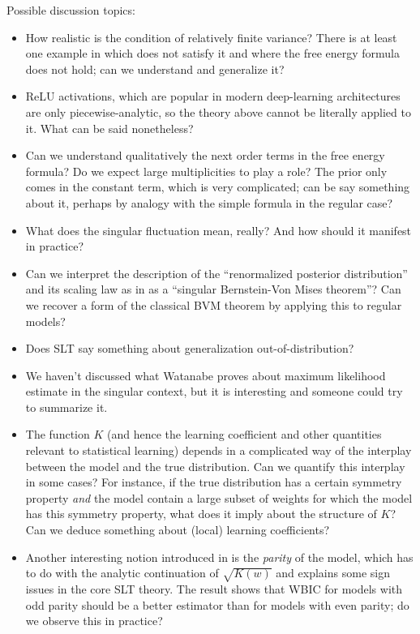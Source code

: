 \documentclass[a4paper,11pt]{amsart}
\begin{document}
Possible discussion topics:
\begin{itemize}
\item How realistic is the condition of relatively finite variance? There is at least one example in \cite[\S 3.4 Example 19]{green-book} which does not satisfy it and where the free energy formula does not hold; can we understand and generalize it?
\item ReLU activations, which are popular in modern deep-learning architectures are only piecewise-analytic, so the theory above cannot be literally applied to it. What can be said nonetheless?
\item Can we understand qualitatively the next order terms in the free energy formula? Do we expect large multiplicities to play a role? The prior only comes in the constant term, which is very complicated; can be say something about it, perhaps by analogy with the simple formula in the regular case?
\item What does the singular fluctuation mean, really? And how should it manifest in practice?
\item Can we interpret the description of the ``renormalized posterior distribution'' and its scaling law as in \cite[\S 6.3]{grey-book} as a ``singular Bernstein-Von Mises theorem''? Can we recover a form of the classical BVM theorem by applying this to regular models?
\item Does SLT say something about generalization out-of-distribution?  
\item We haven't discussed what Watanabe proves about maximum likelihood estimate in the singular context, but it is interesting and someone could try to summarize it.
  \item The function $K$ (and hence the learning coefficient and other quantities relevant to statistical learning) depends in a complicated way of the interplay between the model and the true distribution. Can we quantify this interplay in some cases? For instance, if the true distribution has a certain symmetry property \emph{and} the model contain a large subset of weights for which the model has this symmetry property, what does it imply about the structure of $K$? Can we deduce something about (local) learning coefficients?
\item Another interesting notion introduced in \cite[\S 3]{WBIC} is the \emph{parity} of the model, which has to do with the analytic continuation of $\sqrt{K(w)}$ and explains some sign issues in the core SLT theory. The result \cite[Corollary 1]{WBIC} shows that WBIC for models with odd parity should be a better estimator than for models with even parity; do we observe this in practice?
\end{itemize}
\end{document}
